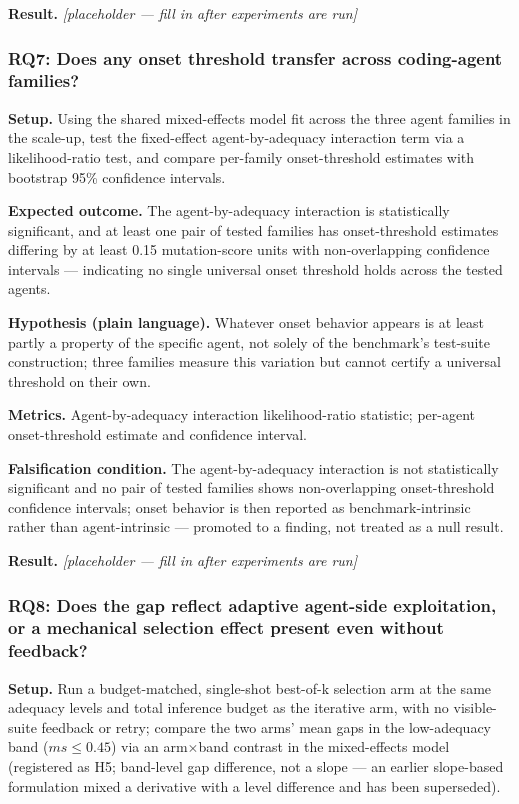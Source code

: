 \documentclass[11pt]{article}
\newcommand{\ph}{\textit{[placeholder --- fill in after experiments are run]}}
\begin{document}
\textbf{Result.} \ph

\subsubsection{RQ7: Does any onset threshold transfer across coding-agent families?}
\textbf{Setup.} Using the shared mixed-effects model fit across the three agent families in the scale-up, test the fixed-effect agent-by-adequacy interaction term via a likelihood-ratio test, and compare per-family onset-threshold estimates with bootstrap 95\% confidence intervals.

\textbf{Expected outcome.} The agent-by-adequacy interaction is statistically significant, and at least one pair of tested families has onset-threshold estimates differing by at least 0.15 mutation-score units with non-overlapping confidence intervals --- indicating no single universal onset threshold holds across the tested agents.

\textbf{Hypothesis (plain language).} Whatever onset behavior appears is at least partly a property of the specific agent, not solely of the benchmark's test-suite construction; three families measure this variation but cannot certify a universal threshold on their own.

\textbf{Metrics.} Agent-by-adequacy interaction likelihood-ratio statistic; per-agent onset-threshold estimate and confidence interval.

\textbf{Falsification condition.} The agent-by-adequacy interaction is not statistically significant and no pair of tested families shows non-overlapping onset-threshold confidence intervals; onset behavior is then reported as benchmark-intrinsic rather than agent-intrinsic --- promoted to a finding, not treated as a null result.

\textbf{Result.} \ph

\subsubsection{RQ8: Does the gap reflect adaptive agent-side exploitation, or a mechanical selection effect present even without feedback?}
\textbf{Setup.} Run a budget-matched, single-shot best-of-k selection arm at the same adequacy levels and total inference budget as the iterative arm, with no visible-suite feedback or retry; compare the two arms' mean gaps in the low-adequacy band ($ms \le 0.45$) via an arm$\times$band contrast in the mixed-effects model (registered as H5; band-level gap difference, not a slope --- an earlier slope-based formulation mixed a derivative with a level difference and has been superseded).
\end{document}
